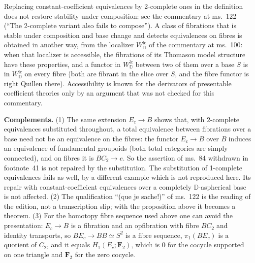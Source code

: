 Replacing constant-coefficient equivalences by 2-complete ones in the definition does not restore stability under composition: see the commentary at ms.~122 (``The 2-complete variant also fails to compose''). A class of fibrations that is stable under composition and base change and detects equivalences on fibres is obtained in another way, from the localizer $W^{\mathrm{lc}}_{\mathbb D}$ of the commentary at ms.~100: when that localizer is accessible, the fibrations of its Thomason model structure \citep[Th\'eor\`eme~5.2.15]{Cisinski2006} have these properties, and a functor in $W^{\mathrm{lc}}_{\mathbb D}$ between two of them over a base $S$ is in $W^{\mathrm{lc}}_{\mathbb D}$ on every fibre (both are fibrant in the slice over $S$, and the fibre functor is right Quillen there). Accessibility is known for the derivators of presentable coefficient theories only by an argument that was not checked for this commentary.

\textbf{Complements.}
(1) The same extension $E_c\to B$ shows that, with 2-complete equivalences substituted throughout, a total equivalence between fibrations over a base need not be an equivalence on the fibres: the functor $E_c\to B$ over $B$ induces an equivalence of fundamental groupoids (both total categories are simply connected), and on fibres it is $BC_2\to e$. So the assertion of ms.~84 withdrawn in footnote~41 is not repaired by the substitution. The substitution of 1-complete equivalences fails as well, by a different example which is not reproduced here. Its repair with constant-coefficient equivalences over a completely $\mathbb D$-aspherical base is not affected.
(2) The qualification ``(que je sache!)'' of ms.~122 is the reading of the edition, not a transcription slip; with the proposition above it becomes a theorem.
(3) For the homotopy fibre sequence used above one can avoid the presentation: $E_c\to B$ is a fibration and an opfibration with fibre $BC_2$ and identity transports, so $BE_c\to BB\simeq S^2$ is a fibre sequence, $\pi_1(BE_c)$ is a quotient of $C_2$, and it equals $H_1(E_c;\mathbf F_2)$, which is $0$ for the cocycle supported on one triangle and $\mathbf F_2$ for the zero cocycle.
